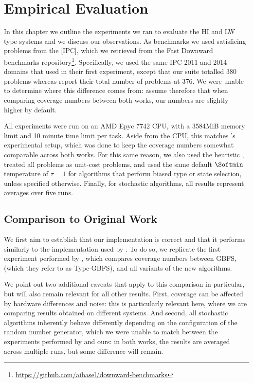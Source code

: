 \chapter{Empirical Evaluation}

In this chapter we outline the experiments we ran to evaluate the HI and LW type systems and we discuss our observations. As benchmarks we used satisficing problems from the [IPC], which we retrieved from the Fast Downward benchmarks repository\footnote{\url{https://github.com/aibasel/downward-benchmarks}}. Specifically, we used the same IPC 2011 and 2014 domains that  used in their first experiment, except that our suite totalled 380 problems whereas  report their total number of problems at 376. We were unable to determine where this difference comes from: assume therefore that when comparing coverage numbers between both works, our numbers are slightly higher by default.

All experiments were run on an AMD Epyc 7742 CPU, with a 3584MiB memory limit and 10 minute time limit per task. Aside from the CPU, this matches 's experimental setup, which was done to keep the coverage numbers somewhat comparable across both works. For this same reason, we also used the  heuristic , treated all problems as unit-cost problems, and used the same default $\Softmin$ temperature of $\tau=1$ for algorithms that perform biased type or state selection, unless specified otherwise. Finally, for stochastic algorithms, all results represent averages over five runs.

\section{Comparison to Original Work}
\label{sec:exprepl}

We first aim to establish that our implementation is correct and that it performs similarly to the implementation used by . To do so, we replicate the first experiment performed by , which compares coverage numbers between GBFS, \hgUu (which they refer to as Type-GBFS), and all variants of the new algorithms.

We point out two additional caveats that apply to this comparison in particular, but will also remain relevant for all other results. First, coverage can be affected by hardware differences and noise: this is particularly relevant here, where we are comparing results obtained on different systems. And second, all stochastic algorithms inherently behave differently depending on the configuration of the random number generator, which we were unable to match between the experiments performed by  and ours: in both works, the results are averaged across multiple runs, but some difference will remain.


